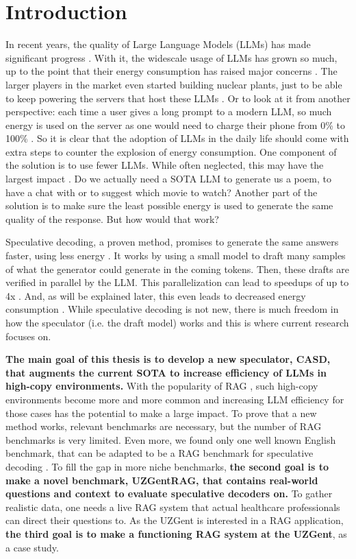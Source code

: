 \chapter{Introduction}
In recent years, the quality of Large Language Models (LLMs) has made significant progress \cite{zhao2023survey}. With it, the widescale usage of LLMs has grown so much, up to the point that their energy consumption has raised major concerns \cite{alizadeh2024analyzing, bender2021dangers, strubell2020energy}. The larger players in the market even started building nuclear plants, just to be able to keep powering the servers that host these LLMs \cite{luscombe2024three, wnn2025facebook, bbc2025ai}. Or to look at it from another perspective: each time a user gives a long prompt to a modern LLM, so much energy is used on the server as one would need to charge their phone from 0\% to 100\% \cite{epoch2025energy}. So it is clear that the adoption of LLMs in the daily life should come with extra steps to counter the explosion of energy consumption. One component of the solution is to use fewer LLMs. While often neglected, this may have the largest impact \cite{alcott2005jevons}. Do we actually need a SOTA LLM to generate us a poem, to have a chat with or to suggest which movie to watch? Another part of the solution is to make sure the least possible energy is used to generate the same quality of the response. But how would that work?

Speculative decoding, a proven method, promises to generate the same answers faster, using less energy \cite{leviathan2023fast, qin2024optimized}. It works by using a small model to draft many samples of what the generator could generate in the coming tokens. Then, these drafts are verified in parallel by the LLM. This parallelization can lead to speedups of up to 4x \cite{li2024eagle}. And, as will be explained later, this even leads to decreased energy consumption \cite{qin2024optimized}. While speculative decoding is not new, there is much freedom in how the speculator (i.e. the draft model) works and this is where current research focuses on.

\textbf{The main goal of this thesis is to develop a new speculator, CASD, that augments the current SOTA to increase efficiency of LLMs in high-copy environments.} With the popularity of RAG \cite{k2view2025GenAI, menlov2025state}, such high-copy environments become more and more common and increasing LLM efficiency for those cases has the potential to make a large impact. To prove that a new method works, relevant benchmarks are necessary, but the number of RAG benchmarks is very limited. Even more, we found only one well known English benchmark, that can be adapted to be a RAG benchmark for speculative decoding \cite{rajpurkar2016squad}. To fill the gap in more niche benchmarks, \textbf{the second goal is to make a novel benchmark, UZGentRAG, that contains real-world questions and context to evaluate speculative decoders on.} To gather realistic data, one needs a live RAG system that actual healthcare professionals can direct their questions to. As the UZGent is interested in a RAG application, \textbf{the third goal is to make a functioning RAG system at the UZGent}, as a case study. 


